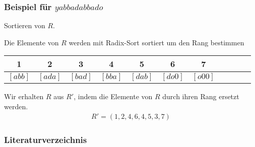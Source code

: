 \documentclass{beamer}
\begin{document}
\begin{frame}[fragile]
\frametitle{Beispiel für $yabbadabbado$}
\begin{description}[l]
    \item[Schritt 1:] Sortieren von $R$.
\end{description}
Die Elemente von $R$ werden mit Radix-Sort sortiert um den Rang bestimmen
\begin{table}
\begin{tabular}{c c c c c c c c c c c}
    \toprule
    1 & 2 & 3 & 4 & 5 & 6 & 7                                           \\
    \midrule
    $[abb]$ & $[ada]$ & $[bad]$ & $[bba]$ & $[dab]$ & $[do0]$ & $[o00]$ \\
    \bottomrule
\end{tabular}
\end{table}
Wir erhalten $R$ aus $R'$, indem die Elemente von $R$ durch ihren Rang ersetzt werden.
\begin{gather*}
    R' = (1,2,4,6,4,5,3,7)
\end{gather*}
\end{frame}

\begin{frame}[allowframebreaks]
\frametitle{Literaturverzeichnis}
\nocite{*}

\end{frame}
\end{document}
